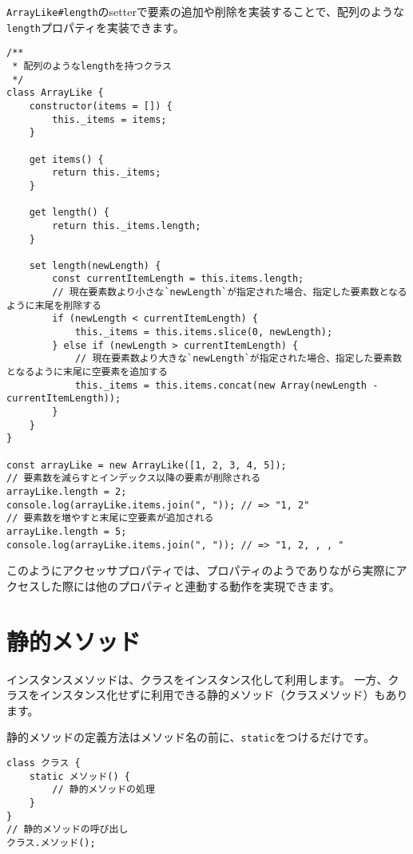 \texttt{ArrayLike\#length}のsetterで要素の追加や削除を実装することで、配列のような\texttt{length}プロパティを実装できます。

\begin{lstlisting}
/**
 * 配列のようなlengthを持つクラス
 */
class ArrayLike {
    constructor(items = []) {
        this._items = items;
    }

    get items() {
        return this._items;
    }

    get length() {
        return this._items.length;
    }

    set length(newLength) {
        const currentItemLength = this.items.length;
        // 現在要素数より小さな`newLength`が指定された場合、指定した要素数となるように末尾を削除する
        if (newLength < currentItemLength) {
            this._items = this.items.slice(0, newLength);
        } else if (newLength > currentItemLength) {
            // 現在要素数より大きな`newLength`が指定された場合、指定した要素数となるように末尾に空要素を追加する
            this._items = this.items.concat(new Array(newLength - currentItemLength));
        }
    }
}

const arrayLike = new ArrayLike([1, 2, 3, 4, 5]);
// 要素数を減らすとインデックス以降の要素が削除される
arrayLike.length = 2;
console.log(arrayLike.items.join(", ")); // => "1, 2"
// 要素数を増やすと末尾に空要素が追加される
arrayLike.length = 5;
console.log(arrayLike.items.join(", ")); // => "1, 2, , , "
\end{lstlisting}

このようにアクセッサプロパティでは、プロパティのようでありながら実際にアクセスした際には他のプロパティと連動する動作を実現できます。

\hypertarget{static-method}{%
\section{静的メソッド}\label{static-method}}

インスタンスメソッドは、クラスをインスタンス化して利用します。
一方、クラスをインスタンス化せずに利用できる静的メソッド（クラスメソッド）もあります。

静的メソッドの定義方法はメソッド名の前に、\texttt{static}をつけるだけです。

\begin{lstlisting}
class クラス {
    static メソッド() {
        // 静的メソッドの処理
    }
}
// 静的メソッドの呼び出し
クラス.メソッド();
\end{lstlisting}

